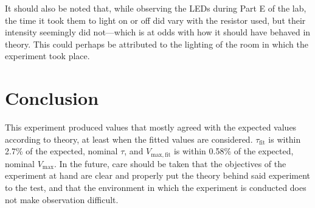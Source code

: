 \documentclass{report}
\begin{document}
	It should also be noted that, while observing the LEDs during Part E of the lab, the time it took them to light on or off did vary with the resistor used, but their intensity seemingly did not---which is at odds with how it should have behaved in theory. This could perhaps be attributed to the lighting of the room in which the experiment took place.

\section{Conclusion}
	This experiment produced values that mostly agreed with the expected values according to theory, at least when the fitted values are considered.
	$\tau_\mathrm{fit}$ is within 2.7\% of the expected, nominal $\tau$, and $V_\mathrm{max,fit}$ is within 0.58\% of the expected, nominal $V_\mathrm{max}$.
	In the future, care should be taken that the objectives of the experiment at hand are clear and properly put the theory behind said experiment to the test, and that the environment in which the experiment is conducted does not make observation difficult.
	

\appendix
\end{document}
